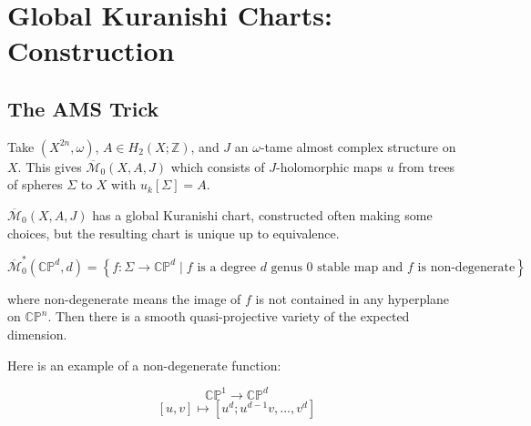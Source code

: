 \chapter{Global Kuranishi Charts: Construction}
\label{s3}

\section{The AMS Trick}

Take $(X^{2n},\omega)$, $A\in H_2(X; \mathbb{Z})$, and $J$ an $\omega$-tame almost complex structure on $X$. This gives $\overline{\mathcal{M}}_0(X,A,J)$ which consists of $J$-holomorphic maps $u$ from trees of spheres $\Sigma$ to $X$ with $u_k[\Sigma]=A$.

\begin{theorem}

$\overline{\mathcal{M}}_0(X,A,J)$ has a global Kuranishi chart, constructed often making some choices, but the resulting chart is unique up to equivalence.

\end{theorem}

\begin{proposition}

\[
\overline{\mathcal{M}}_0^*(\mathbb{CP}^d, d ) = \left\{ f: \Sigma \to \mathbb{CP}^d \mid f \text{ is a degree } d \text{ genus } 0 \text{ stable map and } f \text{ is non-degenerate} \right\}
\]

where non-degenerate means the image of $f$ is not contained in any hyperplane on $\mathbb{CP}^n$. Then there is a smooth quasi-projective variety of the expected dimension.

\end{proposition}

Here is an example of a non-degenerate function:

\begin{example}

\[\mathbb{CP}^1 \to \mathbb{CP}^d\]
\[[u,v]\mapsto [u^d; u^{d-1}v, ..., v^d]\]

\end{example}

